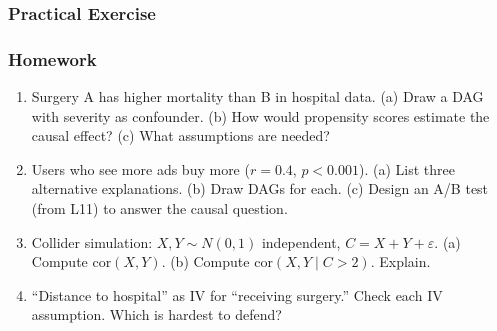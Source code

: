 \documentclass[aspectratio=169]{beamer}
\begin{document}
\begin{frame}
\frametitle{Practical Exercise}
\begin{center}
\end{center}
\end{frame}

\begin{frame}
\frametitle{Homework}
\begin{enumerate}\setlength{\itemsep}{3pt}
  \item Surgery A has higher mortality than B in hospital data.
    (a) Draw a DAG with severity as confounder.
    (b) How would propensity scores estimate the causal effect?
    (c) What assumptions are needed?

  \item Users who see more ads buy more ($r = 0.4$, $p < 0.001$).
    (a) List three alternative explanations. (b) Draw DAGs for each.
    (c) Design an A/B test (from L11) to answer the causal question.

  \item Collider simulation: $X, Y \sim N(0,1)$ independent, $C = X + Y + \varepsilon$.
    (a) Compute $\text{cor}(X, Y)$. (b) Compute $\text{cor}(X, Y \mid C > 2)$. Explain.

  \item ``Distance to hospital'' as IV for ``receiving surgery.''
    Check each IV assumption. Which is hardest to defend?
\end{enumerate}
\end{frame}
\end{document}
